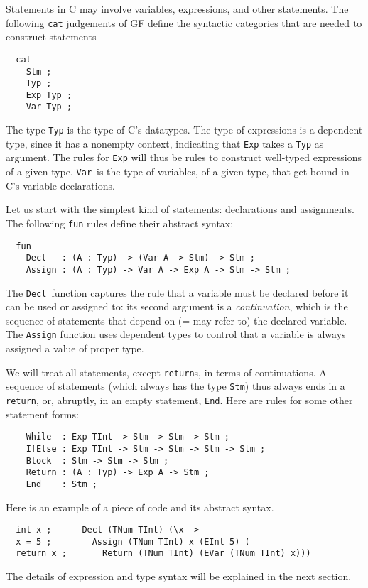 \documentclass[12pt]{article}
\newcommand{\empha}[1]{{\em #1}}
\begin{document}
Statements in C may involve variables, expressions, and
other statements.
The following \texttt{cat} judgements of GF define the syntactic categories
that are needed to construct statements
\begin{verbatim}
  cat
    Stm ;
    Typ ;
    Exp Typ ;
    Var Typ ;
\end{verbatim}
The type \texttt{Typ} is the type of C's datatypes.
The type of expressions is a dependent type, 
since it has a nonempty context, indicating that \texttt{Exp} takes
a \texttt{Typ} as argument. The rules for \texttt{Exp}
will thus be rules to construct well-typed expressions of
a given type. \texttt{Var}\ is the type of variables,
of a given type, that get bound in C's variable
declarations.

Let us start with the simplest kind of statements:
declarations and assignments. The following \texttt{fun}
rules define their abstract syntax:
\begin{verbatim}
  fun
    Decl   : (A : Typ) -> (Var A -> Stm) -> Stm ;
    Assign : (A : Typ) -> Var A -> Exp A -> Stm -> Stm ;
\end{verbatim}
The \texttt{Decl}\ function captures the rule that
a variable must be declared before it can be used or assigned to:
its second argument is a \empha{continuation}, which is
the sequence of statements that depend on (= may refer to)
the declared variable. 
The \texttt{Assign} function uses dependent types to 
control that a variable is always assigned a value of proper
type. 

We will treat all statements, except
\texttt{return}s, in terms of continuations. A sequence of
statements (which always has the type \texttt{Stm}) thus
always ends in a \texttt{return}, or, abruptly, in
an empty statement, \texttt{End}. Here are rules for some other
statement forms:
\begin{verbatim}
    While  : Exp TInt -> Stm -> Stm -> Stm ;
    IfElse : Exp TInt -> Stm -> Stm -> Stm -> Stm ;
    Block  : Stm -> Stm -> Stm ;
    Return : (A : Typ) -> Exp A -> Stm ;
    End    : Stm ;
\end{verbatim}
Here is an example of a piece of code and its abstract syntax.
\begin{verbatim}
  int x ;      Decl (TNum TInt) (\x -> 
  x = 5 ;        Assign (TNum TInt) x (EInt 5) (
  return x ;       Return (TNum TInt) (EVar (TNum TInt) x)))
\end{verbatim}
The details of expression and type 
syntax will be explained in the next section.
\end{document}
